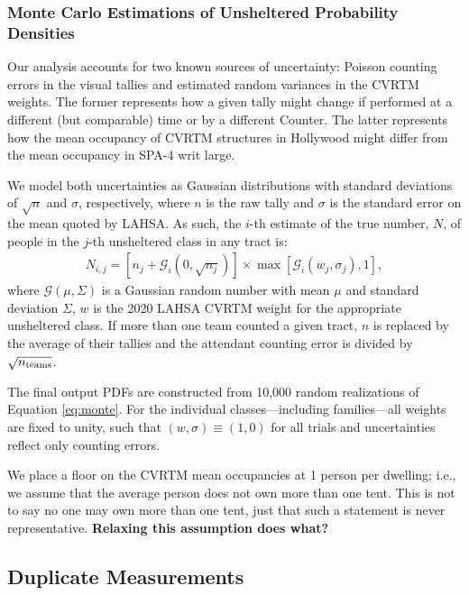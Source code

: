 \documentclass[11pt,twocolumn]{article}
\def\bfr{\bf\color{red}}
\def\resp{respectively}
\begin{document}
\subsubsection{Monte Carlo Estimations of Unsheltered Probability Densities}
\label{sec:mc}

Our analysis accounts for two known sources of uncertainty: Poisson counting errors in the visual
tallies and estimated random variances in the CVRTM weights. The former represents how a given
tally might change if performed at a different (but comparable) time or by a different Counter. The 
latter represents how the mean occupancy of CVRTM structures in Hollywood might differ from
the mean occupancy in SPA-4 writ large. 

We model both uncertainties as Gaussian distributions with standard deviations of 
$\sqrt{n}$ and $\sigma$, \resp, where $n$ is the raw tally and $\sigma$ is the standard error on the 
mean quoted by LAHSA. As such, the $i$-th estimate of the true number, $N$, of people 
in the $j$-th unsheltered class in any tract is:
\begin{multline}\label{eq:monte}
	N_{i,j} = \left[n_{j} + \mathcal{G}_{i}(0,\sqrt{n_{j}})\right]\times\max[\mathcal{G}_{i}(w_{j}, \sigma_{j}),1],
\end{multline}
where $\mathcal{G}(\mu,\Sigma)$ is a Gaussian random number with mean $\mu$ and standard deviation 
$\Sigma$, $w$ is the 2020 LAHSA CVRTM weight for the appropriate unsheltered class. If more than
one team counted a given tract, $n$ is replaced by the average of their tallies and the attendant counting
error is divided by $\sqrt{n_{\rm teams}}$.

The final output PDFs are constructed from 10,000 random realizations of Equation \ref{eq:monte}. 
For the individual classes---including families---all weights are 
fixed to unity, such that $(w,\sigma)\equiv(1,0)$ for all trials and uncertainties reflect only 
counting errors.

We place a floor on the CVRTM mean occupancies at 1 person per dwelling; i.e., we assume that the average
person does not own more than one tent. This is not to say no one may own more than one tent, just that
such a statement is never representative. {\bfr Relaxing this assumption does what?} 

\subsection{Duplicate Measurements}
\label{sec:dupes}
\end{document}
